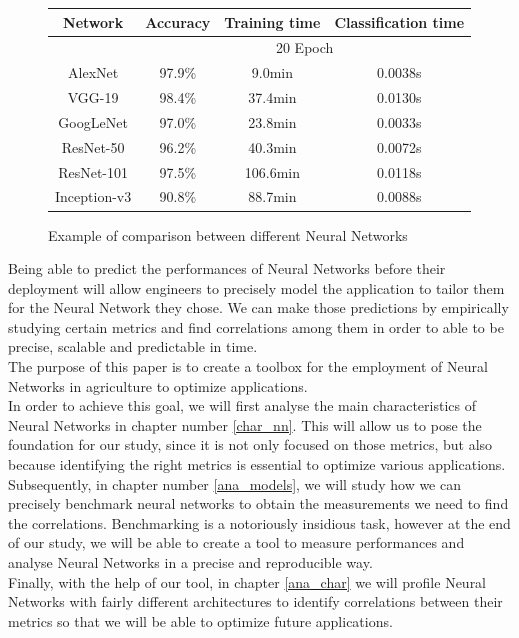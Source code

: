 \begin{figure}[th]
\centering
\begin{tabular}{|c| ccc|}
  \hline
 Network &Accuracy& Training time   &Classification time   \\
 \hline
 &\multicolumn{3}{c|}{20 Epoch}\\
 \hline
AlexNet &97.9\%& 9.0min   &0.0038s    \\
VGG-19 &98.4\%& 37.4min   &0.0130s  \\
GoogLeNet &97.0\%& 23.8min  &0.0033s \\
ResNet-50 &96.2\%& 40.3min  &0.0072s\\
ResNet-101 &97.5\%& 106.6min   &0.0118s \\
Inception-v3 &90.8\%& 88.7min &0.0088s \\
\hline
\end{tabular}
\caption[Example of comparison between different Neural Networks]{Example of comparison between different Neural Networks \cite{suh_transfer_2018}}
 \label{tab:models_ex_comp}
\end{figure}

Being able to predict the performances of Neural Networks before their deployment will allow engineers to precisely model the application to tailor them for the Neural Network they chose. We can make those predictions by empirically studying certain metrics and find correlations among them in order to able to be precise, scalable and predictable in time. \\
The purpose of this paper is to create a toolbox for the employment of Neural Networks in agriculture to optimize applications. \\
In order to achieve this goal, we will first analyse the main characteristics of Neural Networks in chapter number \ref{char_nn}. 
This will allow us to pose the foundation for our study, since it is not only focused on those metrics, but also because identifying the right metrics is essential to optimize various applications. \\
Subsequently, in chapter number \ref{ana_models}, we will study how we can precisely benchmark neural networks to obtain the measurements we need to find the correlations. Benchmarking is a notoriously insidious task, however at the end of our study, we will be able to create a tool to measure performances and analyse Neural Networks in a precise and reproducible way.\\
Finally, with the help of our tool, in chapter \ref{ana_char} we will profile Neural Networks with fairly different architectures to identify correlations between their metrics so that we will be able to optimize future applications. 
